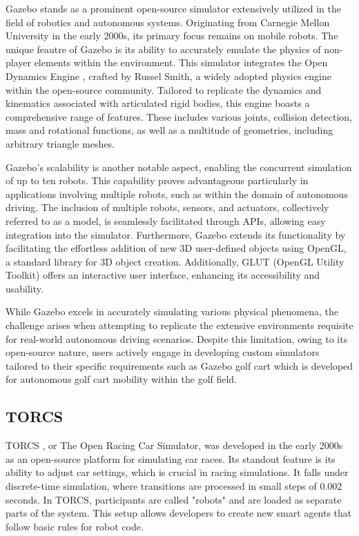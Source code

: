 \documentclass[12pt,twoside,a4paper,parskip]{scrbook} %
\begin{document}
Gazebo \cite{Gazebobase} stands as a prominent open-source simulator extensively utilized in the field of robotics and autonomous systems. Originating from Carnegie Mellon University in the early 2000s, its primary focus remains on mobile robots. The unique feautre of Gazebo is its ability to accurately emulate the physics of non-player elements within the environment.
This simulator integrates the Open Dynamics Engine \cite{opende}, crafted by Russel Smith, a widely adopted physics engine within the open-source community. Tailored to replicate the dynamics and kinematics associated with articulated rigid bodies, this engine boasts a comprehensive range of features. These includes various joints, collision detection, mass and rotational functions, as well as a multitude of geometries, including arbitrary triangle meshes.

Gazebo's scalability is another notable aspect, enabling the concurrent simulation of up to ten robots. This capability proves advantageous particularly in applications involving multiple robots, such as within the domain of autonomous driving. The inclusion of multiple robots, sensors, and actuators, collectively referred to as a model, is seamlessly facilitated through APIs, allowing easy integration into the simulator. Furthermore, Gazebo extends its functionality by facilitating the effortless addition of new 3D user-defined objects using OpenGL, a standard library for 3D object creation. Additionally, GLUT (OpenGL Utility Toolkit) \cite{opengl} offers an interactive user interface, enhancing its accessibility and usability.

While Gazebo excels in accurately simulating various physical phenomena, the challenge arises when attempting to replicate the extensive environments requisite for real-world autonomous driving scenarios. Despite this limitation, owing to its open-source nature, users actively engage in developing custom simulators tailored to their specific requirements such as Gazebo golf cart \cite{golf} which is developed for autonomous golf cart mobility within the golf field.

\subsection{TORCS}
TORCS \cite{torcs}, or The Open Racing Car Simulator, was developed in the early 2000s as an open-source platform for simulating car races. Its standout feature is its ability to adjust car settings, which is crucial in racing simulations. It falls under discrete-time simulation, where transitions are processed in small steps of 0.002 seconds. In TORCS, participants are called "robots" and are loaded as separate parts of the system. This setup allows developers to create new smart agents that follow basic rules for robot code.
\end{document}

